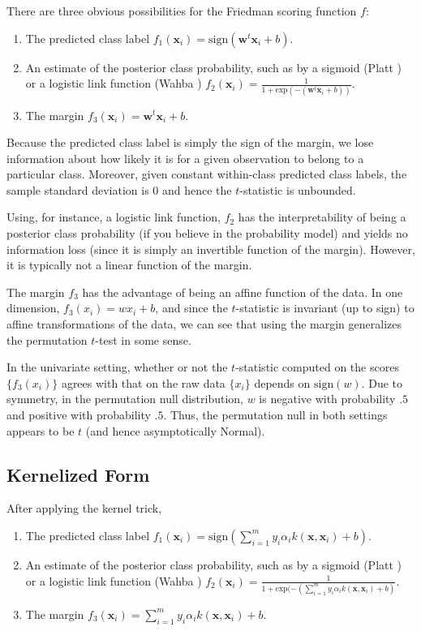 There are three obvious possibilities for the Friedman scoring
function $f$: 
\begin{enumerate}
\item The predicted class label $f_1(\mathbf{x}_i)
= \text{sign}(\mathbf{w}^t \mathbf{x}_i + b)$.
\item An estimate of the posterior class probability, such as by a
sigmoid (Platt \cite{platt1999probabilistic, lin2007note}) or a
logistic link function (Wahba \cite{wahba1992multivariate,
wahba1999support}) 
$f_2(\mathbf{x}_i) = \frac{1}{1 + \text{exp}(-(\mathbf{w}^t \mathbf{x}_i + b))}$.
\item The margin $f_3(\mathbf{x}_i) = \mathbf{w}^t \mathbf{x}_i + b$.
\end{enumerate}

Because the predicted class label is simply the sign of the margin, we
lose information about how likely it is for a given observation
to belong to a particular class.  Moreover, given constant within-class
predicted class labels, the sample standard deviation is $0$ and hence
the $t$-statistic is unbounded.

Using, for instance, a logistic link function, $f_2$ has the
interpretability of being a posterior class probability (if you
believe in the probability model) and yields no information loss
(since it is simply an invertible function of the margin).  However,
it is typically not a linear function of the margin.

The margin $f_3$ has the advantage of being an affine function of the
data.  In one dimension, $f_3(x_i) = w x_i + b$, and since the
$t$-statistic is invariant (up to sign) to affine transformations of
the data, we can see that using the margin generalizes the permutation
$t$-test in some sense.  

In the univariate setting, whether or not the $t$-statistic computed
on the scores $\{f_3(x_i)\}$ agrees with that on the raw data
$\{x_i\}$ depends on $\text{sign}(w)$.  Due to symmetry, in the
permutation null distribution, $w$ is negative with probability $.5$
and positive with probability $.5$.  Thus, the permutation null in
both settings appears to be $t$ (and hence asymptotically Normal).

\subsection{Kernelized Form}
After applying the kernel trick,
\begin{enumerate}
\item The predicted class label $f_1(\mathbf{x}_i)
= \text{sign}(\sum_{i=1}^m y_i \alpha_i k(\mathbf{x}, \mathbf{x}_i) + b)$.
\item An estimate of the posterior class probability, such as by a
sigmoid (Platt \cite{platt1999probabilistic, lin2007note}) or a
logistic link function (Wahba \cite{wahba1992multivariate,
wahba1999support}) 
$f_2(\mathbf{x}_i) = \frac{1}{1 + \text{exp}(-(\sum_{i=1}^m y_i \alpha_i k(\mathbf{x}, \mathbf{x}_i) + b)}$.
\item The margin $f_3(\mathbf{x}_i) = \sum_{i=1}^m y_i \alpha_i k(\mathbf{x}, \mathbf{x}_i) + b$.
\end{enumerate}


